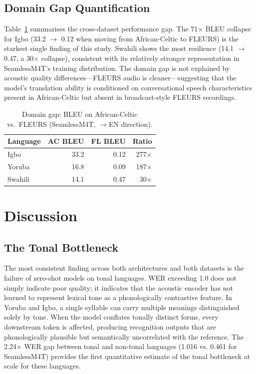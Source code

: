 \documentclass[11pt,a4paper]{article}
\newcommand{\dataAC}{African-Celtic}
\newcommand{\dataFL}{FLEURS}
\begin{document}
\subsection{Domain Gap Quantification}

Table~\ref{tab:gap} summarises the cross-dataset performance gap. The 71$\times$ BLEU collapse for Igbo (33.2 $\to$ 0.12 when moving from \dataAC{} to \dataFL{}) is the starkest single finding of this study. Swahili shows the most resilience (14.1 $\to$ 0.47, a 30$\times$ collapse), consistent with its relatively stronger representation in SeamlessM4T's training distribution. The domain gap is not explained by acoustic quality differences—FLEURS audio is cleaner—suggesting that the model's translation ability is conditioned on conversational speech characteristics present in \dataAC{} but absent in broadcast-style FLEURS recordings.

\begin{table}[t]
\centering
\small
\caption{Domain gap: BLEU on \dataAC{} vs.\ \dataFL{} (SeamlessM4T, $\to$EN direction).}
\label{tab:gap}
\begin{tabular}{lrrr}
\toprule
\textbf{Language} & \textbf{AC BLEU} & \textbf{FL BLEU} & \textbf{Ratio} \\
\midrule
Igbo    & 33.2 & 0.12 & 277$\times$ \\
Yoruba  & 16.8 & 0.09 & 187$\times$ \\
Swahili & 14.1 & 0.47 & 30$\times$  \\
\bottomrule
\end{tabular}
\end{table}

\section{Discussion}
\label{sec:discussion}

\subsection{The Tonal Bottleneck}
The most consistent finding across both architectures and both datasets is the failure of zero-shot models on tonal languages. WER exceeding 1.0 does not simply indicate poor quality; it indicates that the acoustic encoder has not learned to represent lexical tone as a phonologically contrastive feature. In Yoruba and Igbo, a single syllable can carry multiple meanings distinguished solely by tone. When the model conflates tonally distinct forms, every downstream token is affected, producing recognition outputs that are phonologically plausible but semantically uncorrelated with the reference. The 2.24$\times$ WER gap between tonal and non-tonal languages (1.016 vs. 0.461 for SeamlessM4T) provides the first quantitative estimate of the tonal bottleneck at scale for these languages.
\end{document}
